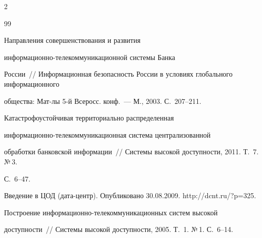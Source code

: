 \begin{multicols}{2}
{\small\frenchspacing


{%




\begin{thebibliography}{99}






Направления совершенствования и развития 


ин\-фор\-ма\-ци\-он\-но-те\-ле\-ком\-му\-ни\-ка\-ци\-он\-ной сис\-те\-мы Бан\-ка 


Рос\-сии~// Информационная безопасность России в условиях глобального информационного 


общества: Мат-лы 5-й Всеросс. конф.~--- М., 2003. С.~207--211.









Ката\-строфоустойчивая территориально распределенная 


ин\-фор\-ма\-ци\-он\-но-те\-ле\-ком\-му\-ни\-ка\-ци\-он\-ная сис\-те\-ма централизованной 


обработки банковской информации~// Системы высокой доступности, 2011. Т.~7. №\,3. 


С.~6--47.









Введение в ЦОД (дата-центр). Опубликовано 30.08.2009. {\sf http://dcnt.ru/?p=325}.









Построение ин\-фор\-ма\-ци\-он\-но-те\-ле\-ком\-му\-ни\-ка\-ци\-он\-ных сис\-тем высокой 


доступности~// Системы высокой доступности, 2005. Т.~1. №\,1. С.~6--14.






\end{thebibliography}}}
\end{multicols}

